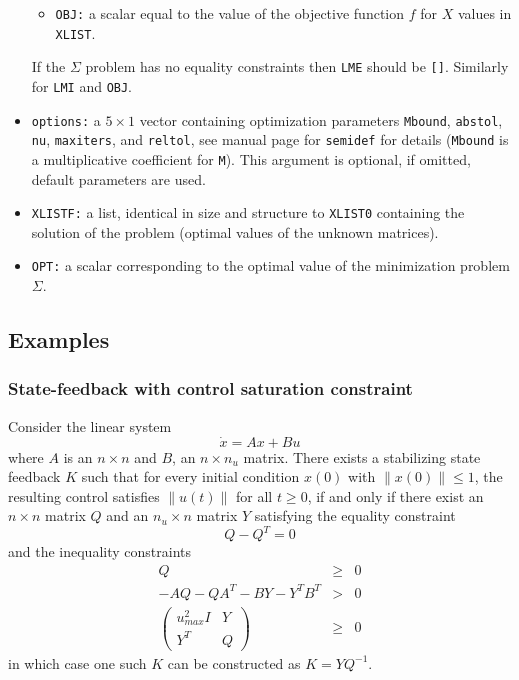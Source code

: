 \begin{itemize}
\begin{itemize}
\item {\tt OBJ:} a scalar equal to the value of the objective function $f$
for $X$ values in {\tt XLIST}.
\end{itemize}
If the $\Sigma$ problem has no equality constraints then {\tt LME}
should be {\tt []}. Similarly for {\tt LMI} and {\tt OBJ}.

\item
{\tt options:} a $5 \times 1$ vector containing optimization
parameters {\tt Mbound}, {\tt abstol}, {\tt nu}, {\tt maxiters},
and {\tt reltol}, see  manual page for {\tt semidef} for details ({\tt Mbound}
is a multiplicative coefficient for {\tt M}). This argument is optional,
if omitted, default parameters are used.


\item {\tt XLISTF:} a list, identical in size and structure to {\tt XLIST0}
containing the solution of the problem (optimal values of the unknown matrices).

\item {\tt OPT:} a scalar corresponding to the optimal value of the minimization
problem $\Sigma$.
\end{itemize}

\subsection{Examples}
\subsubsection{State-feedback with control saturation constraint}
\label{ex1}
Consider the linear system
\[
\dot{x}=Ax+Bu   
\]
where $A$ is an $n\times n$ and $B$, an $n \times n_u$ matrix.
There exists a stabilizing state feedback $K$ 
such that for every initial condition $x(0)$ with $\| x(0)\| \leq 1$,
the resulting control satisfies $\| u(t)\|$ for all $t\geq 0$, if and only if
there exist an $n\times n$ matrix $Q$ and an
$n_u \times n$ matrix $Y$ satisfying the equality constraint
\[
Q-Q^T=0
\]
and the inequality constraints
\begin{eqnarray*}
Q&\geq&0\\
-AQ-QA^T-BY-Y^TB^T &>& 0 \\
\left( \begin{array} {cc}  u_{max}^2I &Y\\Y^T & Q \end{array} \right) &\geq & 0
\end{eqnarray*}
in which case one such $K$ can be constructed as $K=YQ^{-1}$.

